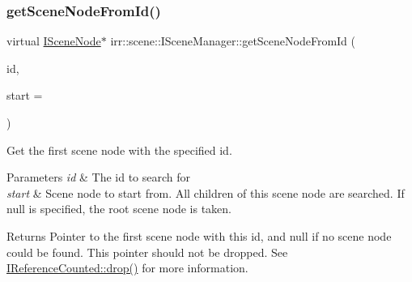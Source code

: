 \subsubsection{\texorpdfstring{get\+Scene\+Node\+From\+Id()}{getSceneNodeFromId()}\hspace{0.1cm}{\footnotesize\ttfamily [2/2]}}
{\footnotesize\ttfamily virtual \hyperlink{classirr_1_1scene_1_1ISceneNode}{I\+Scene\+Node}$\ast$ irr\+::scene\+::\+I\+Scene\+Manager\+::get\+Scene\+Node\+From\+Id (\begin{DoxyParamCaption}\item[{\hyperlink{namespaceirr_ac66849b7a6ed16e30ebede579f9b47c6}{s32}}]{id,  }\item[{\hyperlink{classirr_1_1scene_1_1ISceneNode}{I\+Scene\+Node} $\ast$}]{start = {} }\end{DoxyParamCaption})\hspace{0.3cm}{\ttfamily [pure virtual]}}



Get the first scene node with the specified id. 


\begin{DoxyParams}{Parameters}
{\em id} & The id to search for \\
\hline
{\em start} & Scene node to start from. All children of this scene node are searched. If null is specified, the root scene node is taken. \\
\hline
\end{DoxyParams}
\begin{DoxyReturn}{Returns}
Pointer to the first scene node with this id, and null if no scene node could be found. This pointer should not be dropped. See \hyperlink{classirr_1_1IReferenceCounted_a03856a09355b89d178090c4a5f738543}{I\+Reference\+Counted\+::drop()} for more information. 
\end{DoxyReturn}
\mbox{\label{classirr_1_1scene_1_1ISceneManager_a13ada3cca4b9eadee5e8ba3ccb6683da}} 
